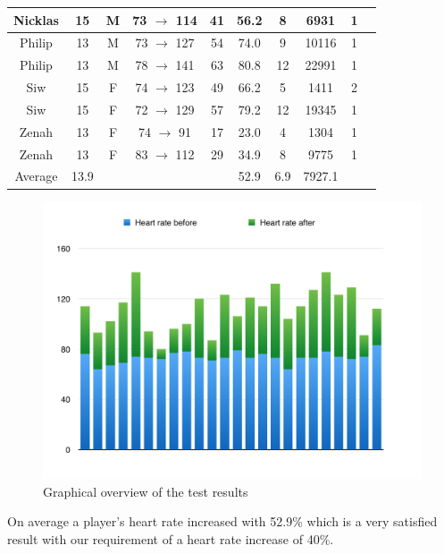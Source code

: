 \documentclass[11pt]{report}
\begin{document}
\begin{table}[H]
\begin{tabular}{ | c | c | c | c | c | c | c | c | c | c |}
Nicklas & 15 & M & 73 $\rightarrow$ 114 & 41 & 56.2 & 8 & 6931 & 1\\ \hline 
Philip & 13 & M & 73 $\rightarrow$ 127 & 54 & 74.0 & 9 & 10116 & 1\\ \hline 
Philip & 13 & M & 78 $\rightarrow$ 141 & 63 & 80.8 &12 & 22991& 1\\ \hline 
Siw & 15 & F & 74 $\rightarrow$ 123 & 49 & 66.2 & 5 & 1411 & 2\\ \hline 
Siw & 15 & F & 72 $\rightarrow$ 129 & 57 & 79.2 & 12 & 19345 & 1\\ \hline 
Zenah & 13 & F & 74 $\rightarrow$ 91 & 17 & 23.0 & 4 & 1304 & 1\\ \hline 
Zenah & 13 & F & 83 $\rightarrow$ 112 & 29 & 34.9 & 8 & 9775 & 1\\ \hline
Average & 13.9 & \multicolumn{2}{r}{} & & 52.9 & 6.9 & 7927.1 & \\ \hline
\end{tabular}
\end{table}

\begin{figure}[H]
	\centering
	\includegraphics[scale=0.60]{../GFX/Resultsgraph.png}
	\caption{Graphical overview of the test results}
\end{figure}

On average a player's heart rate increased with 52.9\% which is a very satisfied result with our requirement of a heart rate increase of 40\%.
\end{document}
